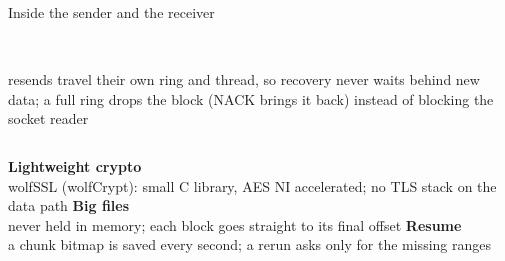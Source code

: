 \documentclass[aspectratio=169,11pt]{beamer}
\begin{document}
\begin{frame}{Inside the sender and the receiver}
\begin{columns}[T]
{}\\[1mm]
    \scriptsize resends travel their own ring and thread, so recovery never waits behind new data;
    a full ring drops the block (NACK brings it back) instead of blocking the socket reader
  \end{columns}
  \vspace{3mm}
  \begin{columns}[T]
    \textbf{\small Lightweight crypto}\\\scriptsize wolfSSL (wolfCrypt): small C library, AES NI accelerated; no TLS stack on the data path
    \textbf{\small Big files}\\\scriptsize never held in memory; each block goes straight to its final offset
    \textbf{\small Resume}\\\scriptsize a chunk bitmap is saved every second; a rerun asks only for the missing ranges
  \end{columns}
\end{frame}
\end{document}
